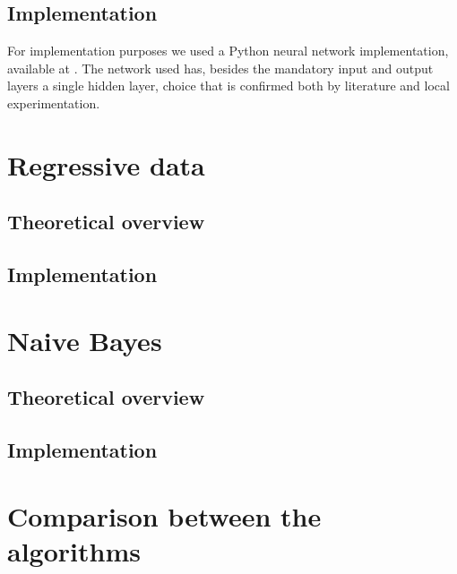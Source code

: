 \subsection{Implementation}

For implementation purposes we used a Python neural network implementation, available at \cite{issam}. The network used has, besides the mandatory input and output layers a single hidden layer, choice that is confirmed both by literature \cite{Hornik1989359,Hartman,cybenko} and local experimentation. 




\section{Regressive data}

\subsection{Theoretical overview}

\subsection{Implementation}


\section{Naive Bayes}

\subsection{Theoretical overview}

\subsection{Implementation}

\section {Comparison between the algorithms}